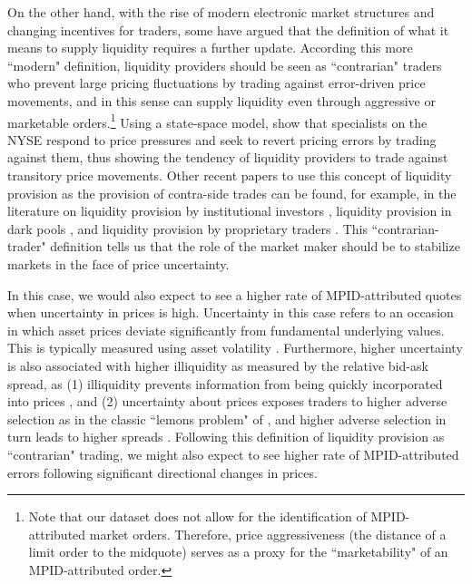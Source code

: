 \documentclass{article}
\begin{document}
On the other hand, with the rise of modern electronic market structures and changing incentives for traders, some have argued that the definition of what it means to supply liquidity requires a further update. According this more ``modern" definition, liquidity providers should be seen as ``contrarian" traders who prevent large pricing fluctuations by trading against error-driven price movements, and in this sense can supply liquidity even through aggressive or marketable orders.\footnote{Note that our dataset does not allow for the identification of MPID-attributed market orders. Therefore, price aggressiveness (the distance of a limit order to the midquote) serves as a proxy for the ``marketability" of an MPID-attributed order.}  Using a state-space model, \citet{Hendershott2014405} show that specialists on the NYSE respond to price pressures and seek to revert pricing errors by trading against them, thus showing the tendency of liquidity providers to trade against transitory price movements. Other recent papers to use this concept of liquidity provision as the provision of contra-side trades can be found, for example, in the literature on liquidity provision by institutional investors \citep[][]{franzoni2013constrains}, liquidity provision in dark pools \citep[][]{boni2013dark}, and liquidity provision by proprietary traders \citep[][]{biais2016supplies}. This ``contrarian-trader" definition tells us that the role of the market maker should be to stabilize markets in the face of price uncertainty.

In this case, we would also expect to see a higher rate of MPID-attributed quotes when uncertainty in prices is high. Uncertainty in this case refers to an occasion in which asset prices deviate significantly from fundamental underlying values. This is typically measured using asset volatility \citep[see, e.g.,][]{chung2014uncertainty}. Furthermore, higher uncertainty is also associated with higher illiquidity as measured by the relative bid-ask spread, as (1) illiquidity prevents information from being quickly incorporated into prices \citep[see, e.g.,][]{chordia2008liquidity}, and (2) uncertainty about prices exposes traders to higher adverse selection as in the classic ``lemons problem" of \citet{akerlof1995market}, and higher adverse selection in turn leads to higher spreads \citep[see, e.g.,][]{kyle1985continuous,huang1997components}. Following this definition of liquidity provision as ``contrarian" trading, we might also expect to see higher rate of MPID-attributed errors following significant directional changes in prices.
\end{document}
